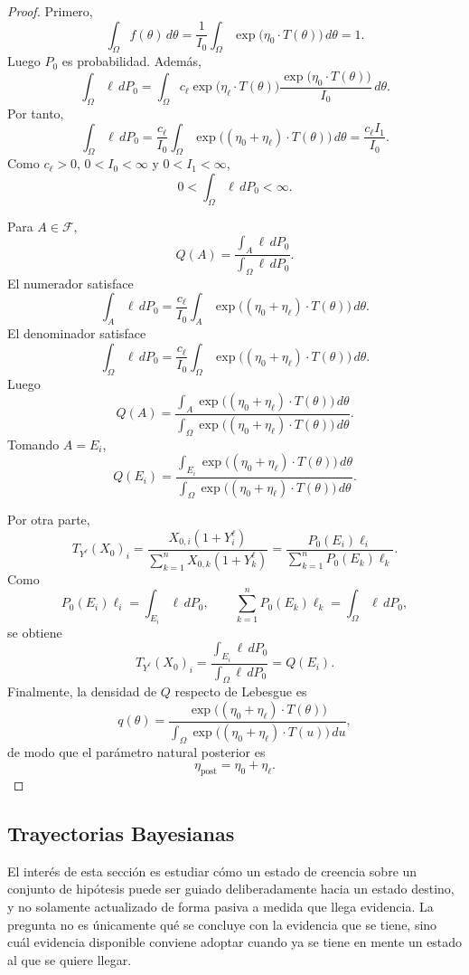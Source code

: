 ﻿\documentclass[12pt]{article}
\begin{document}
\begin{proof}
Primero,
\[
\int_\Omega f(\theta)\,d\theta
=
\frac{1}{I_0}\int_\Omega \exp\bigl(\eta_0\cdot T(\theta)\bigr)\,d\theta
=
1.
\]
Luego $P_0$ es probabilidad. Además,
\[
\int_\Omega\ell\,dP_0
=
\int_\Omega c_\ell\exp\bigl(\eta_\ell\cdot T(\theta)\bigr)
\frac{\exp\bigl(\eta_0\cdot T(\theta)\bigr)}{I_0}\,d\theta.
\]
Por tanto,
\[
\int_\Omega\ell\,dP_0
=
\frac{c_\ell}{I_0}
\int_\Omega\exp\bigl((\eta_0+\eta_\ell)\cdot T(\theta)\bigr)\,d\theta
=
\frac{c_\ell I_1}{I_0}.
\]
Como $c_\ell>0$, $0<I_0<\infty$ y $0<I_1<\infty$,
\[
0<\int_\Omega\ell\,dP_0<\infty.
\]

Para $A\in\mathcal F$,
\[
Q(A)
=
\frac{\displaystyle\int_A\ell\,dP_0}{\displaystyle\int_\Omega\ell\,dP_0}.
\]
El numerador satisface
\[
\int_A\ell\,dP_0
=
\frac{c_\ell}{I_0}
\int_A\exp\bigl((\eta_0+\eta_\ell)\cdot T(\theta)\bigr)\,d\theta.
\]
El denominador satisface
\[
\int_\Omega\ell\,dP_0
=
\frac{c_\ell}{I_0}
\int_\Omega\exp\bigl((\eta_0+\eta_\ell)\cdot T(\theta)\bigr)\,d\theta.
\]
Luego
\[
Q(A)
=
\frac{\displaystyle\int_A\exp\bigl((\eta_0+\eta_\ell)\cdot T(\theta)\bigr)\,d\theta}{\displaystyle\int_\Omega\exp\bigl((\eta_0+\eta_\ell)\cdot T(\theta)\bigr)\,d\theta}.
\]
Tomando $A=E_i$,
\[
Q(E_i)
=
\frac{\displaystyle\int_{E_i}\exp\bigl((\eta_0+\eta_\ell)\cdot T(\theta)\bigr)\,d\theta}{\displaystyle\int_\Omega\exp\bigl((\eta_0+\eta_\ell)\cdot T(\theta)\bigr)\,d\theta}.
\]

Por otra parte,
\[
T_{Y^\ell}(X_0)_i
=
\frac{X_{0,i}(1+Y_i^\ell)}{\displaystyle\sum_{k=1}^nX_{0,k}(1+Y_k^\ell)}
=
\frac{P_0(E_i)\ell_i}{\displaystyle\sum_{k=1}^nP_0(E_k)\ell_k}.
\]
Como
\[
P_0(E_i)\ell_i=\int_{E_i}\ell\,dP_0,
\qquad
\sum_{k=1}^nP_0(E_k)\ell_k=\int_\Omega\ell\,dP_0,
\]
se obtiene
\[
T_{Y^\ell}(X_0)_i
=
\frac{\displaystyle\int_{E_i}\ell\,dP_0}{\displaystyle\int_\Omega\ell\,dP_0}
=Q(E_i).
\]
Finalmente, la densidad de $Q$ respecto de Lebesgue es
\[
q(\theta)
=
\frac{\exp\bigl((\eta_0+\eta_\ell)\cdot T(\theta)\bigr)}{\displaystyle\int_\Omega\exp\bigl((\eta_0+\eta_\ell)\cdot T(u)\bigr)\,du},
\]
de modo que el parámetro natural posterior es
\[
\eta_{\mathrm{post}}=\eta_0+\eta_\ell.
\]
\end{proof}


\subsection{Trayectorias Bayesianas}

El interés de esta sección es estudiar cómo un estado de creencia sobre un conjunto de hipótesis puede ser guiado deliberadamente hacia un estado destino, y no solamente actualizado de forma pasiva a medida que llega evidencia. La pregunta no es únicamente qué se concluye con la evidencia que se tiene, sino cuál evidencia disponible conviene adoptar cuando ya se tiene en mente un estado al que se quiere llegar.
\end{document}

